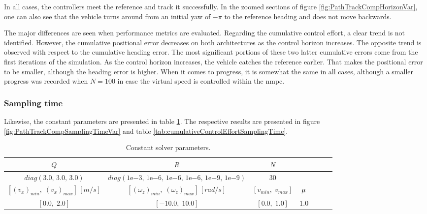 In all cases, the controllers meet the reference and track it successfully. In the zoomed sections of figure \ref{fig:PathTrackCompHorizonVar}, one can also see that the vehicle turns around from an initial yaw of $-\pi$ to the reference heading and does not move backwards.

The major differences are seen when performance metrics are evaluated. Regarding the cumulative control effort, a clear trend is not identified. However, the cumulative positional error decreases on both architectures as the control horizon increases. The opposite trend is observed with respect to the cumulative heading error. The most significant portions of these two latter cumulative errors come from the first iterations of the simulation. As the control horizon increases, the vehicle catches the reference earlier. That makes the positional error to be smaller, although the heading error is higher. When it comes to progress, it is somewhat the same in all cases, although a smaller progress was recorded when $N=100$ in case the virtual speed is controlled within the \acrshort{nmpc}.

\subsubsection*{Sampling time}

Likewise, the constant parameters are presented in table \ref{tab:samplingTimeSpecs}. The respective results are presented in figure \ref{fig:PathTrackCompSamplingTimeVar} and table \ref{tab:cumulativeControlEffortSamplingTime}.

\begin{table}[!htb]
  \caption[Constant solver parameters when sampling time changes.]{Constant solver parameters.}
  \label{tab:samplingTimeSpecs}
  \renewcommand{\arraystretch}{1.2}
  \centering
  \begin{tabular}[]{ccccccc}
	\toprule
        $Q$ & $R$ & $N$\\
	\midrule
        $diag\left(3.0,\,3.0,\,3.0\right)$ & $diag\left(1\mathrm{e}{-3}
,\, 1\mathrm{e}{-6},\,1\mathrm{e}{-6},\,1\mathrm{e}{-6},\,1\mathrm{e}{-9},\,1\mathrm{e}{-9}\right)$ & $30$\\
	\toprule
		$\left[(v_x)_{min},\; (v_x)_{max}\right]\,[m/s]$ & $\left[(\omega_z)_{min},\; (\omega_z)_{max}\right]\,[rad/s]$ & $\left[v_{min},\;v_{max}\right]$ & $\mu$\\
	\midrule
		$[0.0,\;2.0]$ & $[-10.0,\;10.0]$ & $[0.0,\;1.0]$ & $1.0$\\
  	\bottomrule
  \end{tabular}
\end{table}

